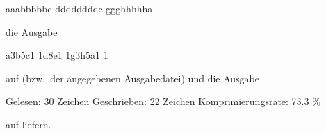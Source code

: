 \begin{osuefmtcode}
      aaabbbbbc
      dddddddde
      ggghhhhha
\end{osuefmtcode}

die Ausgabe

\begin{osuefmtcode}
      a3b5c1
      1d8e1
      1g3h5a1
      1
\end{osuefmtcode}

auf  (bzw.\ der angegebenen Ausgabedatei) und die Ausgabe

\begin{osuefmtcode}
      Gelesen:          30 Zeichen
      Geschrieben:      22 Zeichen
      Komprimierungsrate:   73.3 \%
\end{osuefmtcode}

auf  liefern.


\osueguidelinesone



